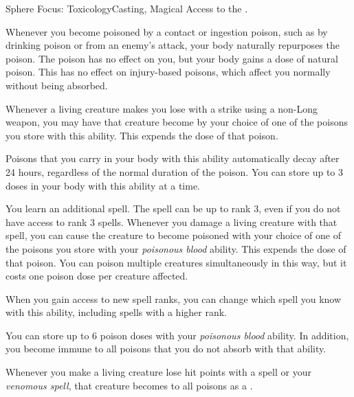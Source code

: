   \begin{magicalfeat}{Sphere Focus: Toxicology}{Casting, Magical}
    \featpre Access to the  .

     Whenever you become poisoned by a contact or ingestion poison, such as by drinking poison or from an enemy's attack, your body naturally repurposes the poison.
    The poison has no effect on you, but your body gains a dose of natural poison.
    This has no effect on injury-based poisons, which affect you normally without being absorbed.

    Whenever a living creature makes you lose  with a  strike using a non-Long weapon, you may have that creature become  by your choice of one of the poisons you store with this ability.
    This expends the dose of that poison.

    Poisons that you carry in your body with this ability automatically decay after 24 hours, regardless of the normal duration of the poison.
    You can store up to 3 doses in your body with this ability at a time.

     You learn an additional spell.
    The spell can be up to rank 3, even if you do not have access to rank 3 spells.
    Whenever you damage a living creature with that spell, you can cause the creature to become poisoned with your choice of one of the poisons you store with your \textit{poisonous blood} ability.
    This expends the dose of that poison.
    You can poison multiple creatures simultaneously in this way, but it costs one poison dose per creature affected.

    When you gain access to new spell ranks, you can change which spell you know with this ability, including spells with a higher rank.

     You can store up to 6 poison doses with your \textit{poisonous blood} ability.
    In addition, you become immune to all poisons that you do not absorb with that ability.

     Whenever you make a living creature lose hit points with a  spell or your \textit{venomous spell}, that creature becomes \vulnerable to all poisons as a .
  \end{magicalfeat}


